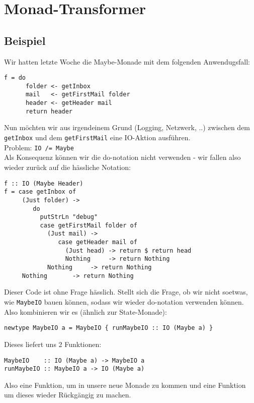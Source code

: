 \documentclass{beamer}
\begin{document}
\section{Monad-Transformer}

\subsection{Beispiel}
\begin{frame}[fragile]
Wir hatten letzte Woche die Maybe-Monade mit dem folgenden Anwendugsfall:
\begin{verbatim}
f = do
      folder <- getInbox
      mail   <- getFirstMail folder
      header <- getHeader mail
      return header
\end{verbatim}
\pause
Nun möchten wir aus irgendeinem Grund (Logging, Netzwerk, ..) zwischen dem \texttt{getInbox} und dem \texttt{getFirstMail} eine IO-Aktion ausführen.\\
\bigskip \pause
Problem: \texttt{IO /= Maybe}\\
\pause
Als Konsequenz können wir die do-notation nicht verwenden - wir fallen also wieder zurück auf die hässliche Notation:
\end{frame}

\begin{frame}[fragile]
\begin{verbatim}
f :: IO (Maybe Header)
f = case getInbox of
     (Just folder) -> 
        do
          putStrLn "debug"
          case getFirstMail folder of
            (Just mail) -> 
               case getHeader mail of
                 (Just head) -> return $ return head
                 Nothing     -> return Nothing
            Nothing     -> return Nothing
     Nothing       -> return Nothing
\end{verbatim}
\end{frame}

\begin{frame}[fragile]
Dieser Code ist ohne Frage hässlich. Stellt sich die Frage, ob wir nicht soetwas, wie \texttt{MaybeIO} bauen können, sodass wir wieder do-notation verwenden können.\\
\pause
Also kombinieren wir es (ähnlich zur State-Monade):
\begin{verbatim}
newtype MaybeIO a = MaybeIO { runMaybeIO :: IO (Maybe a) }
\end{verbatim}
\pause
Dieses liefert uns 2 Funktionen:
\begin{verbatim}
MaybeIO    :: IO (Maybe a) -> MaybeIO a
runMaybeIO :: MaybeIO a -> IO (Maybe a)
\end{verbatim}
Also eine Funktion, um in unsere neue Monade zu kommen und eine Funktion um dieses wieder Rückgängig zu machen.
\end{frame}
\end{document}
